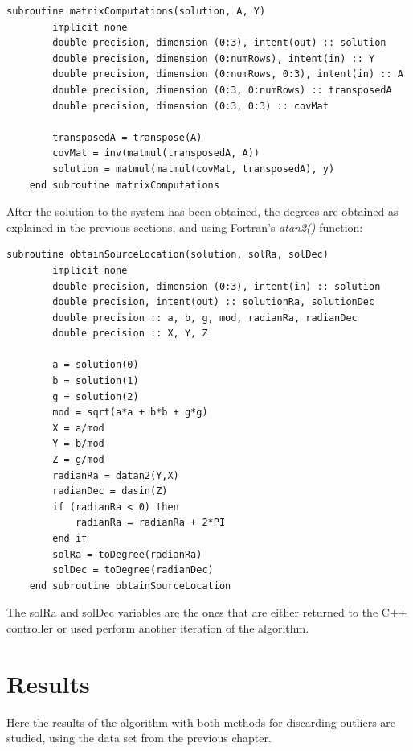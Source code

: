 \begin{minipage}{\linewidth}
	\label{lst:solveSystem}
	\begin{lstlisting}[style=myFortranStyle, caption=Function matrixComputations to solve the system]
	subroutine matrixComputations(solution, A, Y)
		implicit none
		double precision, dimension (0:3), intent(out) :: solution
		double precision, dimension (0:numRows), intent(in) :: Y
		double precision, dimension (0:numRows, 0:3), intent(in) :: A
		double precision, dimension (0:3, 0:numRows) :: transposedA
		double precision, dimension (0:3, 0:3) :: covMat
		
		transposedA = transpose(A)
		covMat = inv(matmul(transposedA, A))
		solution = matmul(matmul(covMat, transposedA), y)
	end subroutine matrixComputations\end{lstlisting}
\end{minipage}

After the solution to the system has been obtained, the degrees are obtained as explained in the previous sections, and using Fortran's \textit{atan2()} function:

\begin{minipage}{\linewidth}
	\label{lst:obtainSource}
	\begin{lstlisting}[style=myFortranStyle, caption=Obtaining the source's location using the system's solution]
	subroutine obtainSourceLocation(solution, solRa, solDec)
		implicit none
		double precision, dimension (0:3), intent(in) :: solution
		double precision, intent(out) :: solutionRa, solutionDec
		double precision :: a, b, g, mod, radianRa, radianDec
		double precision :: X, Y, Z
		
		a = solution(0)
		b = solution(1)
		g = solution(2)
		mod = sqrt(a*a + b*b + g*g)
		X = a/mod
		Y = b/mod
		Z = g/mod
		radianRa = datan2(Y,X)
		radianDec = dasin(Z)
		if (radianRa < 0) then
			radianRa = radianRa + 2*PI
		end if
		solRa = toDegree(radianRa)
		solDec = toDegree(radianDec)
	end subroutine obtainSourceLocation\end{lstlisting}
\end{minipage}

The solRa and solDec variables are the ones that are either returned to the C++ controller or used perform another iteration of the algorithm.

\section{Results}

Here the results of the algorithm with both methods for discarding outliers are studied, using the data set from the previous chapter.


